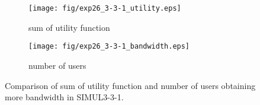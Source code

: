\begin{figure}
	\begin{center}
		\begin{subfigure}[b]{0.8\textwidth}
			\centering
			\texttt{[image: fig/exp26\_3-3-1\_utility.eps]}
			\caption{sum of utility function}
			\label{figure:simul3_3_1_u_a}
		\end{subfigure}
		\begin{subfigure}[b]{0.8\textwidth}
			\centering
			\texttt{[image: fig/exp26\_3-3-1\_bandwidth.eps]}
			\caption{number of users}
			\label{figure:simul3_3_1_u_b}
		\end{subfigure}
		\caption{Comparison of sum of utility function and number of users obtaining more bandwidth in SIMUL3-3-1.}
		\label{figure:simul3_3_1_u}
	\end{center}
\end{figure}

\clearpage


